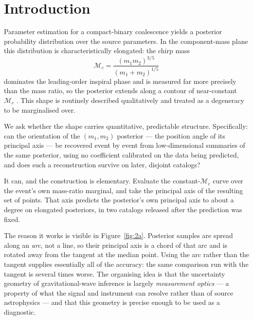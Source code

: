 \documentclass[aps,preprint,amsmath,amssymb,nofootinbib,superscriptaddress]{revtex4-2}
\begin{document}
\section{Introduction}
\label{sec:intro}
Parameter estimation for a compact-binary coalescence yields a posterior probability distribution over the
source parameters. In the component-mass plane this distribution is characteristically elongated: the chirp
mass
\begin{equation}
\mathcal{M}_c = \frac{(m_1 m_2)^{3/5}}{(m_1+m_2)^{1/5}}
\end{equation}
dominates the leading-order inspiral phase and is measured far more precisely than the mass ratio, so the
posterior extends along a contour of near-constant $\mathcal{M}_c$ \citep{CutlerFlanagan1994,
PoissonWill1995, Hannam2013}. This shape is routinely described qualitatively and treated as a degeneracy
to be marginalised over.

We ask whether the shape carries quantitative, predictable structure. Specifically: can the orientation of
the $(m_1,m_2)$ posterior --- the position angle of its principal axis --- be recovered event by event from
low-dimensional summaries of the same posterior, using no coefficient calibrated on the data being
predicted, and does such a reconstruction survive on later, disjoint catalogs?

It can, and the construction is elementary. Evaluate the constant-$\mathcal{M}_c$ curve over the event's
own mass-ratio marginal, and take the principal axis of the resulting set of points. That axis predicts the
posterior's own principal axis to about a degree on elongated posteriors, in two catalogs released after
the prediction was fixed.

The reason it works is visible in Figure~\ref{fig:2a}. Posterior samples are spread along an \emph{arc},
not a line, so their principal axis is a chord of that arc and is rotated away from the tangent at the
median point. Using the arc rather than the tangent supplies essentially all of the accuracy: the same
comparison run with the tangent is several times worse. The organising idea is that the uncertainty
geometry of gravitational-wave inference is largely \emph{measurement optics} --- a property of what the
signal and instrument can resolve rather than of source astrophysics --- and that this geometry is precise
enough to be used as a diagnostic.
\end{document}
